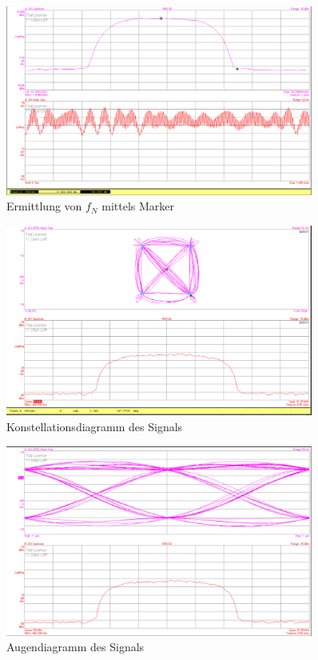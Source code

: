 \documentclass[12pt,a4paper,ngerman]{article}
\begin{document}
\pagebreak

\begin{figure}[H]
\centering
\includegraphics[width=0.9\textwidth]{figures/Aufgabe1_QPSK_B.jpg} 
\caption{Ermittlung von $f_N$ mittels Marker}
\label{fig:1_}
\end{figure}

\begin{figure}[H]
\centering
\includegraphics[width=0.9\textwidth]{figures/Aufgabe1_QPSK_demod.jpg} 
\caption{Konstellationsdiagramm des Signals}
\end{figure}

\pagebreak

\begin{figure}[H]
\centering
\includegraphics[width=0.9\textwidth]{figures/Aufgabe1_QPSK_demod_i_eye.jpg} 
\caption{Augendiagramm des Signals}
\end{figure}
\end{document}
